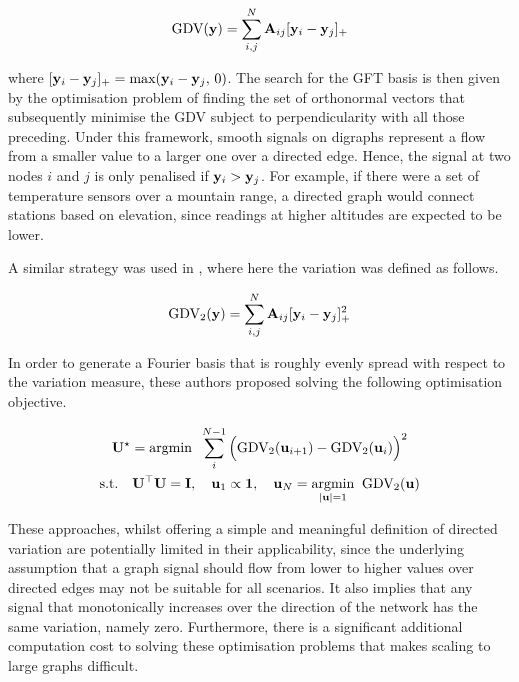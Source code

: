 \begin{equation}
    \text{GDV}(\mathbf{y}) = \sum_{i,j}^N \mathbf{A}_{ij} [\mathbf{y}_i - \mathbf{y}_j]_{+}
\end{equation}

where $[\mathbf{y}_i - \mathbf{y}_j]_{+} = \text{max}(\mathbf{y}_i - \mathbf{y}_j, \, 0)$. The search for the GFT basis is then given by the optimisation problem of finding the set of orthonormal vectors that subsequently minimise the GDV subject to perpendicularity with all those preceding. Under this framework, smooth signals on digraphs represent a flow from a smaller value to a larger one over a directed edge. Hence, the signal at two nodes $i$ and $j$ is only penalised if $\mathbf{y}_i > \mathbf{y}_j$. For example, if there were a set of temperature sensors over a mountain range, a directed graph would connect stations based on elevation, since readings at higher altitudes are expected to be lower. 

A similar strategy was used in \cite{Shafipour2019}, where here the variation was defined as follows.  

\begin{equation}
    \text{GDV}_2(\mathbf{y}) = \sum_{i,j}^N \mathbf{A}_{ij} [\mathbf{y}_i - \mathbf{y}_j]_{+}^2
\end{equation}

In order to generate a Fourier basis that is roughly evenly spread with respect to the variation measure, these authors proposed solving the following optimisation objective. 

\begin{equation}
    \begin{gathered}
    \mathbf{U}^{\star} = \text{argmin} \;\; \sum_{i}^{N-1} \Big(\text{GDV}_2(\mathbf{u}_{i+1}) - \text{GDV}_2(\mathbf{u}_i)\Big)^2 \\
    \text{s.t.} \quad \mathbf{U}^\top\mathbf{U} = \mathbf{I}, \quad \mathbf{u}_1 \propto \mathbf{1}, \quad \mathbf{u}_N = \underset{|\mathbf{u}| = 1}{\text{argmin} } \;\; \text{GDV}_2(\mathbf{u})
    \end{gathered}
\end{equation}

These approaches, whilst offering a simple and meaningful definition of directed variation are potentially limited in their applicability, since the underlying assumption that a graph signal should flow from lower to higher values over directed edges may not be suitable for all scenarios. It also implies that any signal that monotonically increases over the direction of the network has the same variation, namely zero. Furthermore, there is a significant additional computation cost to solving these optimisation problems that makes scaling to large graphs difficult. 

